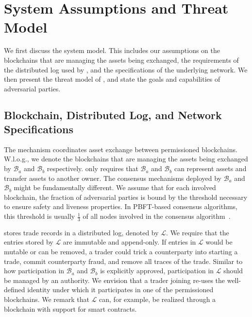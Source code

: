 
\section{System Assumptions and Threat Model}
\label{sec:system_threat_model}
We first discuss the \ModelName{} system model.
This includes our assumptions on the blockchains that are managing the assets being exchanged, the requirements of the distributed log used by \ModelName{}, and the specifications of the underlying \ModelName{} network.
We then present the threat model of \ModelName{}, and state the goals and capabilities of adversarial parties.

\subsection{Blockchain, Distributed Log, and Network Specifications}
\label{sec:blockchain_network_specs}
The \ModelName{} mechanism coordinates asset exchange between permissioned blockchains.
W.l.o.g., we denote the blockchains that are managing the assets being exchanged by $ \mathcal{B}_a $ and $ \mathcal{B}_b $ respectively.
\ModelName{} only requires that $ \mathcal{B}_a $ and $ \mathcal{B}_b $ can represent assets and transfer assets to another owner.
The consensus mechanisms deployed by $ \mathcal{B}_a $ and $ \mathcal{B}_b $ might be fundamentally different.
We assume that for each involved blockchain, the fraction of adversarial parties is bound by the threshold necessary to ensure safety and liveness properties.
In PBFT-based consensus algorithms, this threshold is usually $ \frac{1}{3} $ of all nodes involved in the consensus algorithm~\cite{castro1999practical}.

\ModelName{} stores trade records in a distributed log, denoted by $ \mathcal{L} $.
We require that the entries stored by $ \mathcal{L} $ are immutable and append-only.
If entries in $ \mathcal{L} $ would be mutable or can be removed, a trader could trick a counterparty into starting a trade, commit counterparty fraud, and remove all traces of the trade.
Similar to how participation in $ \mathcal{B}_a $ and $ \mathcal{B}_b $ is explicitly approved, participation in $ \mathcal{L} $ should be managed by an authority.
We envision that a trader joining \ModelName{} re-uses the well-defined identity under which it participates in one of the permissioned blockchains.
We remark that $ \mathcal{L} $ can, for example, be realized through a blockchain with support for smart contracts.

